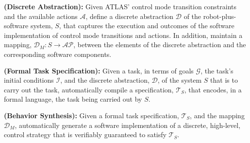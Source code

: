 
\begin{myProblem}\label{DiscreteAbstractionProblem}
\textbf{(Discrete Abstraction):}
Given ATLAS' control mode transition constraints and the available actions $\mathcal{A}$, define a discrete abstraction $\mathcal{D}$ of the robot-plus-software system, $S$, that captures the execution and outcomes of the software implementation of control mode transitions and actions.
In addition, maintain a mapping, $\mathcal{D}_M : S \rightarrow \mathcal{AP}$, between the elements of the discrete abstraction and the corresponding software components.
\end{myProblem}

\begin{myProblem}\label{SpecificationProblem}
\textbf{(Formal Task Specification):}
Given a task, in terms of goals $\mathcal{G}$, the task's initial conditions $\mathcal{I}$, and the discrete abstraction, $\mathcal{D}$, of the system $S$ that is to carry out the task, automatically compile a specification, $\mathcal{T}_S$, that encodes, in a formal language, the task being carried out by $S$.
\end{myProblem}

\begin{myProblem}\label{BehaviorSynthesisProblem}
\textbf{(Behavior Synthesis):}
Given a formal task specification, $\mathcal{T}_S$, and the mapping $\mathcal{D}_M$, automatically generate a software implementation of a discrete, high-level, control strategy that is verifiably guaranteed to satisfy $\mathcal{T}_S$.
\end{myProblem}

